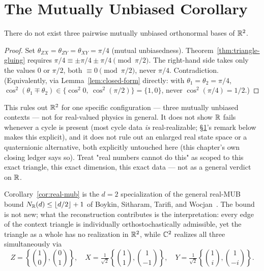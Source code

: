 \section{The Mutually Unbiased Corollary}
\label{sec:mub-corollary}

\begin{corollary}[Real MUB obstruction, $d=2$]
\label{cor:real-mub}
There do not exist three pairwise mutually unbiased orthonormal bases of $\mathbb{R}^2$.
\end{corollary}

\begin{proof}
Set $\theta_{ZX} = \theta_{ZY} = \theta_{XY} = \pi/4$ (mutual unbiasedness).
Theorem~\ref{thm:triangle-gluing} requires $\pi/4 \equiv \pm\pi/4 \pm \pi/4
\pmod{\pi/2}$. The right-hand side takes only the values $0$ or $\pi/2$, both
$\equiv 0 \pmod{\pi/2}$, never $\pi/4$. Contradiction. (Equivalently, via
Lemma~\ref{lem:closed-form} directly: with $\theta_1=\theta_2=\pi/4$,
$\cos^2(\theta_1\mp\theta_2) \in \{\cos^2 0,\ \cos^2(\pi/2)\} = \{1,0\}$, never
$\cos^2(\pi/4) = 1/2$.)
\end{proof}

\begin{scopebox}
\scopetitle{}This rules out $\mathbb{R}^2$ for one specific configuration — three
mutually unbiased contexts — not for real-valued physics in general. It
does not show $\mathbb{R}$ fails whenever a cycle is present (most cycle data
\emph{is} real-realizable; \S\ref{sec:mub-corollary}'s remark below makes
this explicit), and it does not rule out an enlarged real state space or
a quaternionic alternative, both explicitly untouched here (this
chapter's own closing ledger says so). Treat "real numbers cannot do
this" as scoped to this exact triangle, this exact dimension, this exact
data — not as a general verdict on $\mathbb{R}$.
\end{scopebox}

\begin{remark}
Corollary~\ref{cor:real-mub} is the $d=2$ specialization of the general real-MUB
bound $N_{\mathbb{R}}(d) \le \lfloor d/2 \rfloor + 1$ of Boykin, Sitharam, Tarifi, and
Wocjan~\cite{boykin}. The bound is not new; what the reconstruction contributes
is the interpretation: every edge of the context triangle is individually
orthostochastically admissible, yet the triangle as a whole has no realization in
$\mathbb{R}^2$, while $\mathbb{C}^2$ realizes all three simultaneously via
\begin{equation}
Z = \left\{\binom{1}{0}, \binom{0}{1}\right\}, \quad
X = \tfrac{1}{\sqrt2}\left\{\binom{1}{1}, \binom{1}{-1}\right\}, \quad
Y = \tfrac{1}{\sqrt2}\left\{\binom{1}{i}, \binom{1}{-i}\right\}.
\end{equation}
\end{remark}

